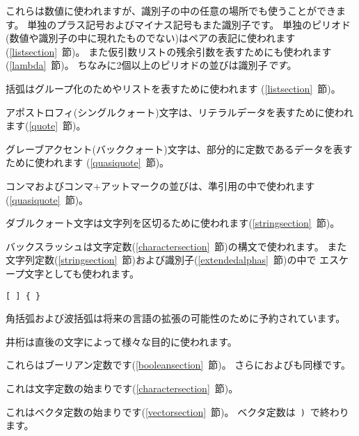 \begin{description}{}{}

\item[{\tt.\ + -}]
これらは数値に使われますが、識別子の中の任意の場所でも使うことができます。
単独のプラス記号およびマイナス記号もまた識別子です。
単独のピリオド(数値や識別子の中に現れたものでない)はペアの表記に使われます(\ref{listsection}~節)。
また仮引数リストの残余引数を表すためにも使われます(\ref{lambda}~節)。
ちなみに2個以上のピリオドの並びは識別子{\em です}。

\item[\tt( )]
括弧はグループ化のためやリストを表すために使われます
(\ref{listsection}~節)。

\item[\singlequote]
アポストロフィ(シングルクォート)文字は、リテラルデータを表すために使われます(\ref{quote}~節)。

\item[\backquote]
グレーブアクセント(バッククォート)文字は、部分的に定数であるデータを表すために使われます
(\ref{quasiquote}~節)。

\item[\tt, ,@]
コンマおよびコンマ+アットマークの並びは、準引用の中で使われます(\ref{quasiquote}~節)。

\item[\tt"]
ダブルクォート文字は文字列を区切るために使われます(\ref{stringsection}~節)。

\item[\backwhack]
バックスラッシュは文字定数(\ref{charactersection}~節)の構文で使われます。
また文字列定数(\ref{stringsection}~節)および識別子(\ref{extendedalphas}~節)の中で
エスケープ文字としても使われます。

\hbox{\tt \verb"[" \verb"]" \verb"{" \verb"}"}
\item[\copy0]
角括弧および波括弧は将来の言語の拡張の可能性のために予約されています。

\item[\sharpsign]
井桁は直後の文字によって様々な目的に使われます。

\item[\schtrue{} \schfalse{}]
これらはブーリアン定数です(\ref{booleansection}~節)。
さらにおよびも同様です。

\item[\sharpsign\backwhack]
これは文字定数の始まりです(\ref{charactersection}~節)。

\item[\sharpsign\tt(]
これはベクタ定数の始まりです(\ref{vectorsection}~節)。
ベクタ定数は~{\tt)}~で終わります。


\end{description}
